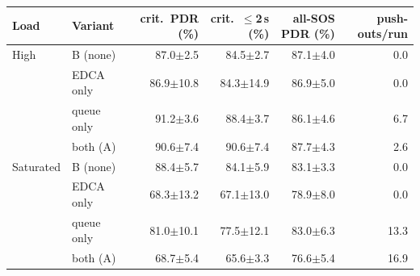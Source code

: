 \begin{tabular}{@{}llrrrr@{}}\toprule
Load & Variant & crit.\ PDR (\%) & crit.\ $\le$2\,s (\%) & all-SOS PDR (\%) & push-outs/run\\\midrule
High & B (none) & 87.0$\pm$2.5 & 84.5$\pm$2.7 & 87.1$\pm$4.0 & 0.0\\
 & EDCA only & 86.9$\pm$10.8 & 84.3$\pm$14.9 & 86.9$\pm$5.0 & 0.0\\
 & queue only & 91.2$\pm$3.6 & 88.4$\pm$3.7 & 86.1$\pm$4.6 & 6.7\\
 & both (A) & 90.6$\pm$7.4 & 90.6$\pm$7.4 & 87.7$\pm$4.3 & 2.6\\
\midrule
Saturated & B (none) & 88.4$\pm$5.7 & 84.1$\pm$5.9 & 83.1$\pm$3.3 & 0.0\\
 & EDCA only & 68.3$\pm$13.2 & 67.1$\pm$13.0 & 78.9$\pm$8.0 & 0.0\\
 & queue only & 81.0$\pm$10.1 & 77.5$\pm$12.1 & 83.0$\pm$6.3 & 13.3\\
 & both (A) & 68.7$\pm$5.4 & 65.6$\pm$3.3 & 76.6$\pm$5.4 & 16.9\\
\bottomrule\end{tabular}